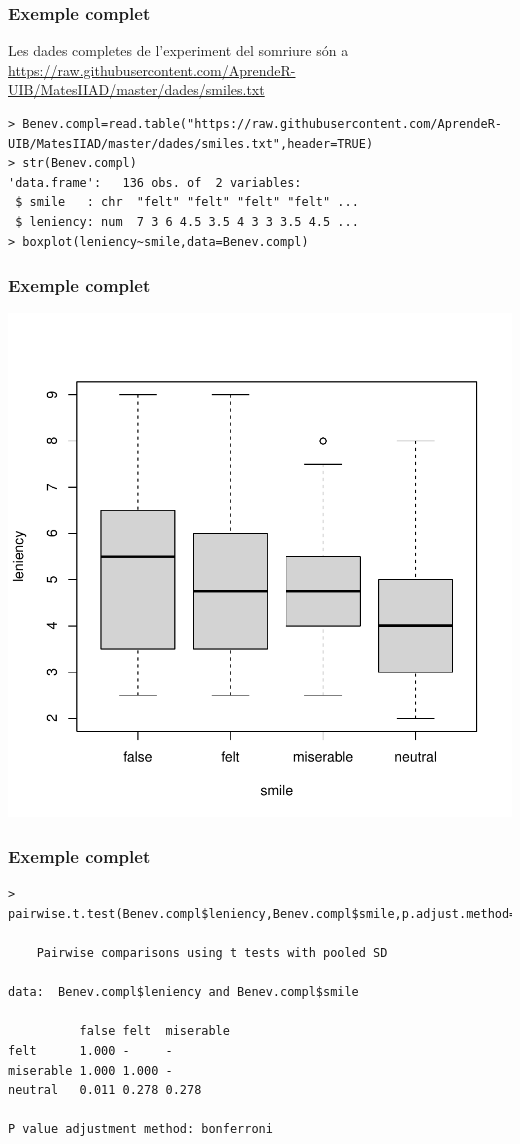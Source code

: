 \documentclass[12pt,t]{beamer}
\newcommand{\blue}[1]{\textcolor{blue}{#1}}
\theoremstyle{plain}
\theoremstyle{definition}
\begin{document}
\begin{frame}[fragile]
\frametitle{Exemple complet} 

Les dades completes de l'experiment del somriure són a  \blue{\url{https://raw.githubusercontent.com/AprendeR-UIB/MatesIIAD/master/dades/smiles.txt}}\medskip


\begin{lstlisting}
> Benev.compl=read.table("https://raw.githubusercontent.com/AprendeR-UIB/MatesIIAD/master/dades/smiles.txt",header=TRUE)
> str(Benev.compl)
'data.frame':	136 obs. of  2 variables:
 $ smile   : chr  "felt" "felt" "felt" "felt" ...
 $ leniency: num  7 3 6 4.5 3.5 4 3 3 3.5 4.5 ...
> boxplot(leniency~smile,data=Benev.compl)
\end{lstlisting}
\end{frame}


\begin{frame}
\frametitle{Exemple complet} \vspace*{-2ex}


\begin{center}
\includegraphics[width=0.8\linewidth]{boxplot}
\end{center}
\end{frame}


\begin{frame}[fragile]
\frametitle{Exemple complet} 

\begin{lstlisting}
> pairwise.t.test(Benev.compl$leniency,Benev.compl$smile,p.adjust.method="bonferroni") 

	Pairwise comparisons using t tests with pooled SD 

data:  Benev.compl$leniency and Benev.compl$smile 

          false felt  miserable
felt      1.000 -     -        
miserable 1.000 1.000 -        
neutral   0.011 0.278 0.278    

P value adjustment method: bonferroni 
\end{lstlisting}
\end{frame}
\end{document}
